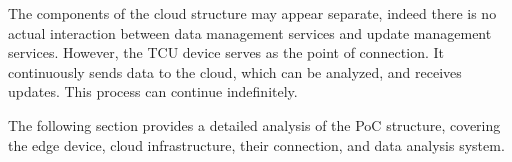 The components of the cloud structure may appear separate, indeed there is no actual interaction between data management services and update management services. However, the TCU device serves as the point of connection. It continuously sends data to the cloud, which can be analyzed, and receives updates. This process can continue indefinitely.

The following section provides a detailed analysis of the PoC structure, covering the edge device, cloud infrastructure, their connection, and data analysis system.